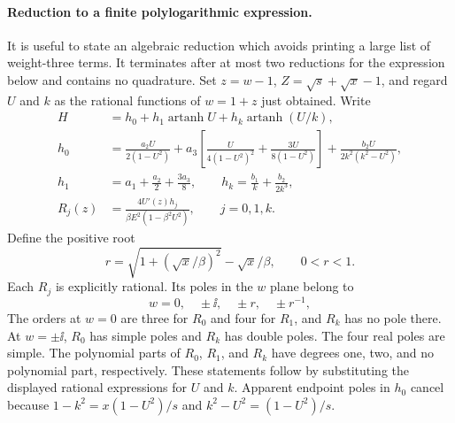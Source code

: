 \paragraph{Reduction to a finite polylogarithmic expression.}
It is useful to state an algebraic reduction which avoids printing a
large list of weight-three terms. It terminates after at most two
reductions for the expression below and contains no quadrature.
Set $z=w-1$, $Z=\sqrt{s}+\sqrt{x}-1$, and regard $U$ and $k$ as the
rational functions of $w=1+z$ just obtained. Write
\begin{align}
 H&=h_0+h_1\operatorname{artanh}U
       +h_k\operatorname{artanh}(U/k),\\
 h_0&=\frac{a_2U}{2(1-U^2)}
 +a_3\left[\frac{U}{4(1-U^2)^2}
 +\frac{3U}{8(1-U^2)}\right]
 +\frac{b_2U}{2k^2(k^2-U^2)},\\
 h_1&=a_1+\frac{a_2}2+\frac{3a_3}8,
 \qquad h_k=\frac{b_1}k+\frac{b_2}{2k^3},\\
 R_j(z)&=\frac{4U'(z)h_j}{\beta E^2(1-\beta^2U^2)},
 \qquad j=0,1,k.
\end{align}
Define the positive root
\begin{equation}
 r=\sqrt{1+(\sqrt{x}/\beta)^2}-\sqrt{x}/\beta,\qquad 0<r<1.
\end{equation}
Each $R_j$ is explicitly rational. Its poles in the $w$ plane belong to
\begin{equation}
 w=0,\quad \pm\ii,\quad \pm r,\quad \pm r^{-1},
\end{equation}
The orders at $w=0$ are three for $R_0$ and
four for $R_1$, and $R_k$ has no pole there. At $w=\pm\ii$, $R_0$ has
simple poles and $R_k$ has double poles. The four real poles are simple.
The polynomial parts of $R_0$, $R_1$, and $R_k$ have degrees one, two,
and no polynomial part, respectively. These statements follow by
substituting the displayed rational expressions for $U$ and $k$.
Apparent endpoint poles in $h_0$
cancel because $1-k^2=x(1-U^2)/s$ and $k^2-U^2=(1-U^2)/s$.



